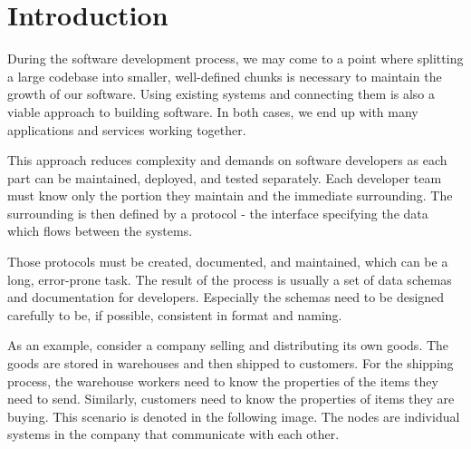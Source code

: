 \chapter*{Introduction}

During the software development process, we may come to a point where splitting a large codebase into smaller, well-defined chunks is necessary to maintain the growth of our software. Using existing systems and connecting them is also a viable approach to building software. In both cases, we end up with many applications and services working together.

This approach reduces complexity and demands on software developers as each part can be maintained, deployed, and tested separately. Each developer team must know only the portion they maintain and the immediate surrounding. The surrounding is then defined by a protocol - the interface specifying the data which flows between the systems.

Those protocols must be created, documented, and maintained, which can be a long, error-prone task. The result of the process is usually a set of data schemas and documentation for developers. Especially the schemas need to be designed carefully to be, if possible, consistent in format and naming.

\bigskip

As an example, consider a company selling and distributing its own goods. The goods are stored in warehouses and then shipped to customers. For the shipping process, the warehouse workers need to know the properties of the items they need to send. Similarly, customers need to know the properties of items they are buying. This scenario is denoted in the following image. The nodes are individual systems in the company that communicate with each other.

\begin{figure}[h]\centering
{}
\end{figure}

